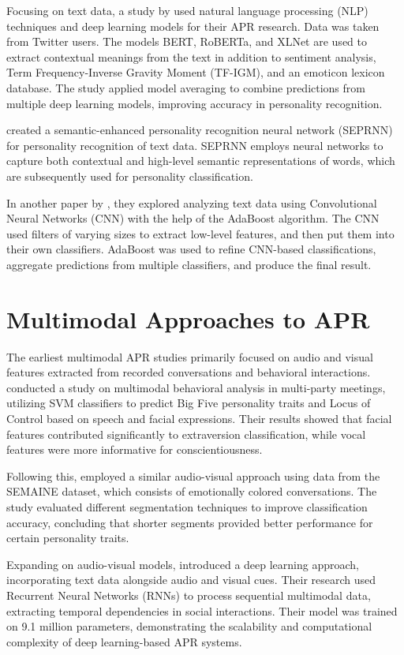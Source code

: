 Focusing on text data, a study by \citet{Christian2021} used natural language processing (NLP) techniques and deep learning models for their APR research. Data was taken from Twitter users. The models BERT, RoBERTa, and XLNet are used to extract contextual meanings from the text in addition to sentiment analysis, Term Frequency-Inverse Gravity Moment (TF-IGM), and an emoticon lexicon database. The study applied model averaging to combine predictions from multiple deep learning models, improving accuracy in personality recognition.

\citet{Xue2021} created a semantic-enhanced personality recognition neural network (SEPRNN) for personality recognition of text data. SEPRNN employs neural networks to capture both contextual and high-level semantic representations of words, which are subsequently used for personality classification.

In another paper by \citet{Deilami2022}, they explored analyzing text data using Convolutional Neural Networks (CNN) with the help of the AdaBoost algorithm. The CNN used filters of varying sizes to extract low-level features, and then put them into their own classifiers. AdaBoost was used to refine CNN-based classifications, aggregate predictions from multiple classifiers, and produce the final result.

\section{Multimodal Approaches to APR}
\label{sec: MMApproaches}
The earliest multimodal APR studies primarily focused on audio and visual features extracted from recorded conversations and behavioral interactions. \citet{Pianesi2008} conducted a study on multimodal behavioral analysis in multi-party meetings, utilizing SVM classifiers to predict Big Five personality traits and Locus of Control based on speech and facial expressions. Their results showed that facial features contributed significantly to extraversion classification, while vocal features were more informative for conscientiousness.

Following this, \citet{Sidorov2014} employed a similar audio-visual approach using data from the SEMAINE dataset, which consists of emotionally colored conversations. The study evaluated different segmentation techniques to improve classification accuracy, concluding that shorter segments provided better performance for certain personality traits.

Expanding on audio-visual models, \citet{Lima2022} introduced a deep learning approach, incorporating text data alongside audio and visual cues. Their research used Recurrent Neural Networks (RNNs) to process sequential multimodal data, extracting temporal dependencies in social interactions. Their model was trained on 9.1 million parameters, demonstrating the scalability and computational complexity of deep learning-based APR systems.

